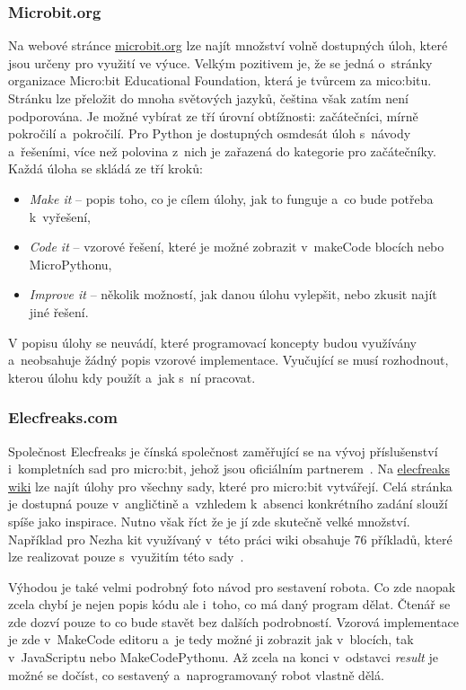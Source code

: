 \documentclass[
  digital,     %
  oneside,     %
  nosansbold,  %
  colorbold, %
  lof,         %
  nolot,         %
]{fithesis4}
\begin{document}
\subsubsection{Microbit.org}
Na webové stránce \href{https://microbit.org/teach/classroom-resources/}{microbit.org} lze najít množství volně dostupných úloh, které jsou určeny pro využití ve výuce. Velkým pozitivem je, že se jedná o~stránky organizace Micro:bit Educational Foundation, která je tvůrcem za mico:bitu. Stránku lze přeložit do mnoha světových jazyků, čeština však zatím není podporována. Je možné vybírat ze tří úrovní obtížnosti: začátečníci, mírně pokročilí a~pokročilí. Pro Python je dostupných osmdesát úloh s~návody a~řešeními, více než polovina z~nich je zařazená do kategorie pro začátečníky. Každá úloha se skládá ze tří kroků:
\begin{itemize}
    \item \textit{Make it} -- popis toho, co je cílem úlohy, jak to funguje a~co bude potřeba k~vyřešení,
    \item \textit{Code it} -- vzorové řešení, které je možné zobrazit v~makeCode blocích nebo MicroPythonu,
    \item \textit{Improve it} -- několik možností, jak danou úlohu vylepšit, nebo zkusit najít jiné řešení.
\end{itemize}
V popisu úlohy se neuvádí, které programovací koncepty budou využívány a~neobsahuje žádný popis vzorové implementace. Vyučující se musí rozhodnout, kterou úlohu kdy použít a~jak s~ní pracovat.

\subsubsection{Elecfreaks.com}
Společnost Elecfreaks je čínská společnost zaměřující se na vývoj příslušenství i~kompletních sad pro micro:bit, jehož jsou oficiálním partnerem~\cite{elecfreaks}. Na \href{https://www.elecfreaks.com/learn-en/index.html}{elecfreaks wiki} lze najít úlohy pro všechny sady, které pro micro:bit vytvářejí. Celá stránka je dostupná pouze v~angličtině a~vzhledem k~absenci konkrétního zadání slouží spíše jako inspirace. Nutno však říct že je jí zde skutečně velké množství. Například pro Nezha kit využívaný v~této práci wiki obsahuje 76 příkladů, které lze realizovat pouze s~využitím této sady~\cite{nezhaelecfreaks}. 

Výhodou je také velmi podrobný foto návod pro sestavení robota. Co zde naopak zcela chybí je nejen popis kódu ale i~toho, co má daný program dělat. Čtenář se zde dozví pouze to co bude stavět bez dalších podrobností. Vzorová implementace je zde v~MakeCode editoru a~je tedy možné ji zobrazit jak v~blocích, tak v~JavaScriptu nebo MakeCodePythonu. Až zcela na konci v~odstavci \textit{result} je možné se dočíst, co sestavený a~naprogramovaný robot vlastně dělá.
\end{document}
